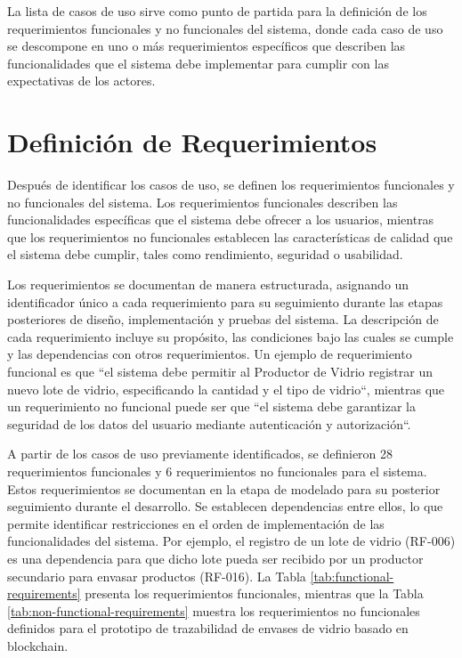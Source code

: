 La lista de casos de uso sirve como punto de partida para la definición de los requerimientos funcionales y no funcionales del sistema, donde cada caso de uso se descompone en uno o más requerimientos específicos que describen las funcionalidades que el sistema debe implementar para cumplir con las expectativas de los actores.

\section{Definición de Requerimientos}
\label{sec:requirements-definition}

Después de identificar los casos de uso, se definen los requerimientos funcionales y no funcionales del sistema. Los requerimientos funcionales describen las funcionalidades específicas que el sistema debe ofrecer a los usuarios, mientras que los requerimientos no funcionales establecen las características de calidad que el sistema debe cumplir, tales como rendimiento, seguridad o usabilidad.

Los requerimientos se documentan de manera estructurada, asignando un identificador único a cada requerimiento para su seguimiento durante las etapas posteriores de diseño, implementación y pruebas del sistema. La descripción de cada requerimiento incluye su propósito, las condiciones bajo las cuales se cumple y las dependencias con otros requerimientos. Un ejemplo de requerimiento funcional es que ``el sistema debe permitir al Productor de Vidrio registrar un nuevo lote de vidrio, especificando la cantidad y el tipo de vidrio``, mientras que un requerimiento no funcional puede ser que ``el sistema debe garantizar la seguridad de los datos del usuario mediante autenticación y autorización``.

A partir de los casos de uso previamente identificados, se definieron 28 requerimientos funcionales y 6 requerimientos no funcionales para el sistema. Estos requerimientos se documentan en la etapa de modelado para su posterior seguimiento durante el desarrollo. Se establecen dependencias entre ellos, lo que permite identificar restricciones en el orden de implementación de las funcionalidades del sistema. Por ejemplo, el registro de un lote de vidrio (RF-006) es una dependencia para que dicho lote pueda ser recibido por un productor secundario para envasar productos (RF-016). La Tabla \ref{tab:functional-requirements} presenta los requerimientos funcionales, mientras que la Tabla \ref{tab:non-functional-requirements} muestra los requerimientos no funcionales definidos para el prototipo de trazabilidad de envases de vidrio basado en blockchain.

